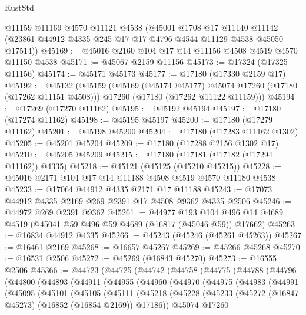 \begin{lexlean}{RustStd}
\begin{coremodule}
    @11159
    @11169
    @4570
    @11121
    @4538
    (@45001
      @1708
      @17
      @11140
      @11142
      (@23861 @44912 @4335 @245 @17 @17 @4796 @4544 @11129 @4538 @45050 @17514))
@45169 := @45016 @2160 @104 @17 @14 @11156 @4508 @4519 @4570 @11150 @4538
@45171 := @45067 @2159 @11156
@45173 := @17324 (@17325 @11156)
@45174 := @45171 @45173
@45177 := @17180 (@17330 @2159 @17)
@45192 := @45132
    (@45159
      (@45169 (@45174 @45177) @45074 @17260 (@17180 (@17262 @11151 @4508)))
      @17260
      (@17180 (@17262 @11122 @11159)))
@45194 := @17269 (@17270 @11162)
@45195 := @45192 @45194
@45197 := @17180 (@17274 @11162)
@45198 := @45195 @45197
@45200 := @17180 (@17279 @11162)
@45201 := @45198 @45200
@45204 := @17180 (@17283 @11162 @1302)
@45205 := @45201 @45204
@45209 := @17180 (@17288 @2156 @1302 @17)
@45210 := @45205 @45209
@45215 := @17180 (@17181 (@17182 (@17294 @11162)) @4335)
@45218 := @45121 (@45125 (@45210 @45215))
@45228 := @45016 @2171 @104 @17 @14 @11188 @4508 @4519 @4570 @11180 @4538
@45233 := @17064 @44912 @4335 @2171 @17 @11188
@45243 := @17073 @44912 @4335 @2169 @269 @2391 @17 @4508 @9362 @4335 @2506
@45246 := @44972 @269 @2391 @9362
@45261 := @44977
    @193
    @104
    @496
    @14
    @4689
    @4519
    (@45041 @59 @496 @59 @4689 (@16817 (@45046 @59)) @17662)
@45263 := @16834 @44912 @4335
@45266 := @45243 (@45246 (@45261 @45263))
@45267 := @16461 @2169
@45268 := @16657 @45267
@45269 := @45266 @45268
@45270 := @16531 @2506
@45272 := @45269 (@16843 @45270)
@45273 := @16555 @2506
@45366 := @44723
    (@44725
      (@44742
        (@44758
          (@44775
            (@44788
              (@44796
                (@44800
                  (@44893
                    (@44911
                      (@44955
                        (@44960
                          (@44970
                            (@44975
                              (@44983
                                (@44991
                                  (@45095
                                    (@45101
                                      (@45105
                                        (@45111
                                          (@45218
                                            (@45228
                                              (@45233
                                                (@45272
                                                  (@16847 @45273)
                                                  (@16852 (@16854 @2169))
                                                  @17186))
                                              @45074
                                              @17260

\end{coremodule}
\end{lexlean}
